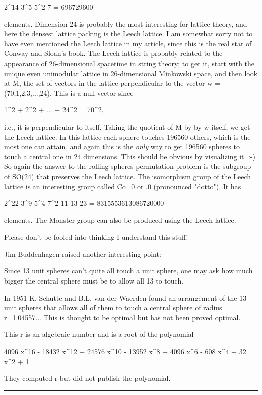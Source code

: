 2^{14} 3^{5} 5^{2} 7 = 696729600

elements.
Dimension 24 is probably the most interesting for lattice theory, and here
the densest lattice packing is the Leech lattice.  I am somewhat sorry 
not to have even mentioned the Leech lattice in my article, since this is
the real star of Conway and Sloan's book.  The Leech lattice is probably 
related to the appearance of 26-dimensional spacetime in string theory; 
to get it, start with the unique even unimodular lattice in 26-dimensional 
Minkowski space, and then look at M, the set of vectors in the lattice 
perpendicular to the vector w = (70,1,2,3,...,24).  This is a null vector 
since
 
1^{2} + 2^{2} + ... + 24^{2} = 70^{2},
 
i.e., it is perpendicular to itself.  Taking the quotient of M by
by w itself, we get the Leech lattice.  In this lattice each sphere
touches 196560 others, which is the most one can attain, and again this
is the \emph{only} way to get 196560 spheres to touch a central one in 24
dimensions.  This should be obvious by visualizing it.  :-)  So again the
answer to the rolling spheres permutation problem is the subgroup of
SO(24) that preserves the Leech lattice.  The isomorphism group of the
Leech lattice is an interesting group called Co_{0} or .0 (pronounced
"dotto").   It has

2^{22} 3^{9} 5^{4} 7^{2} 11 13 23 = 8315553613086720000

elements.  The Monster group can also be produced using the Leech lattice.

Please don't be fooled into thinking I understand this stuff!

Jim Buddenhagen raised another interesting point:

Since 13 unit spheres can't quite all touch a unit sphere, one may ask how
much bigger the central sphere must be to allow all 13 to touch.
 
In 1951 K. Schutte and B.L. van der Waerden found an arrangement of the
13 unit spheres that allows all of them to touch a central sphere of radius
r=1.04557... This is thought to be optimal but has not been proved optimal.
 
This r is an algebraic number and is a root of the polynomial
 
4096 x^{16} - 18432 x^{12} + 24576 x^{10} - 13952 x^{8} + 4096 x^{6} - 608 x^{4} + 32 x^{2} + 1 
 
They computed r but did not publish the polynomial.


\par\noindent\rule{\textwidth}{0.4pt}


